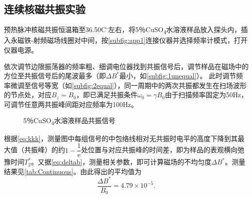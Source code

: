 \subsection{连续核磁共振实验} %
	\label{sub:连续核磁共振实验}
	\par 预热脉冲核磁共振恒温箱至36.50C$^{\circ}$左右，将5％CuSO\textsubscript{4}水溶液样品放入探头内，插入永磁铁-射频磁场线圈对中间，按\cref{subfig:app1}连接仪器并选择频率计模式，打开仪器电源。\\
	\par 依次调节边限振荡器的频率粗、细调电位器找到共振信号后，调节样品在磁场中的方位至共振信号后的尾波最多（即$\Delta B^{*}$最小，如\cref{subfig:1unequal}）。
	此时调节频率微调至信号等宽（如\cref{subfig:2equal}），同一周期中的两次共振都发生在扫场波形的节点处，对应$B_z = B_0$，即已满足共振条件$\omega_0=\gamma B_0$由于扫描频率固定为50Hz，可调节任意两共振峰间距对应频率为100Hz。
	\begin{figure}[hbtp]
		\centering
		\hspace{1cm}
		\caption{5％CuSO\textsubscript{4}水溶液样品共振信号}\label{fig:Continuous1}
	\end{figure}
	根据\cref{eq:kkk}，测量图中每组信号的中包络线相对无共振时电平的高度下降到其最大值（共振峰）的约$1-\dfrac{1}{\mathrm{e}}$处位置与对应共振峰的时间差，即为样品的表观横向弛豫时间$T_2^*$。又据\cref{eq:deltab}，测量相关参数，即可计算磁场的不均匀度$\Delta B^*$。测量结果见\cref{tab:Continuous}。由此得出的平均值为
	\begin{equation}
		\dfrac{\Delta B^*}{B_0}=4.79\times 10^{-5}.
	\end{equation}
